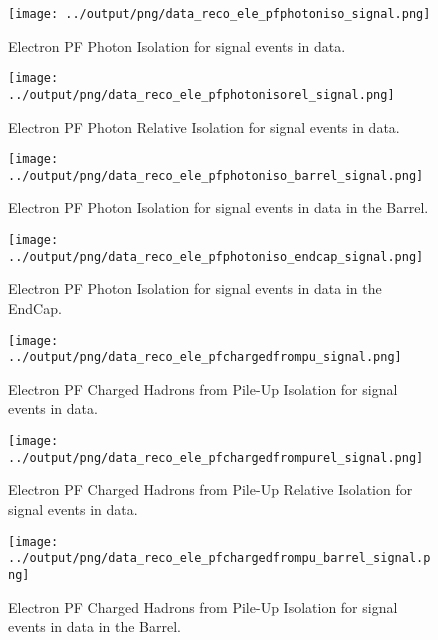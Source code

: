 \documentclass[11pt]{book}
\begin{document}
\begin{figure}[htb]
\centering
\texttt{[image: ../output/png/data\_reco\_ele\_pfphotoniso\_signal.png]}
\caption{Electron PF Photon Isolation for signal events in data.}
\label{fig:data_ele_pfphotoniso_signal}
\end{figure}

\begin{figure}[htb]
\centering
\texttt{[image: ../output/png/data\_reco\_ele\_pfphotonisorel\_signal.png]}
\caption{Electron PF Photon Relative Isolation for signal events in data.}
\label{fig:data_ele_pfphotonisorel_signal}
\end{figure}

\begin{figure}[htb]
\centering
\texttt{[image: ../output/png/data\_reco\_ele\_pfphotoniso\_barrel\_signal.png]}
\caption{Electron PF Photon Isolation for signal events in data in the Barrel.}
\label{fig:data_ele_pfphotoniso_barrel_signal}
\end{figure}

\begin{figure}[htb]
\centering
\texttt{[image: ../output/png/data\_reco\_ele\_pfphotoniso\_endcap\_signal.png]}
\caption{Electron PF Photon Isolation for signal events in data in the EndCap.}
\label{fig:data_ele_pfphotoniso_endcap_signal}
\end{figure}

\begin{figure}[htb]
\centering
\texttt{[image: ../output/png/data\_reco\_ele\_pfchargedfrompu\_signal.png]}
\caption{Electron PF Charged Hadrons from Pile-Up Isolation for signal events in data.}
\label{fig:data_ele_pfchargedfrompu_signal}
\end{figure}

\begin{figure}[htb]
\centering
\texttt{[image: ../output/png/data\_reco\_ele\_pfchargedfrompurel\_signal.png]}
\caption{Electron PF Charged Hadrons from Pile-Up Relative Isolation for signal events in data.}
\label{fig:data_ele_pfchargedfrompurel_signal}
\end{figure}

\begin{figure}[htb]
\centering
\texttt{[image: ../output/png/data\_reco\_ele\_pfchargedfrompu\_barrel\_signal.png]}
\caption{Electron PF Charged Hadrons from Pile-Up Isolation for signal events in data in the Barrel.}
\label{fig:data_ele_pfchargedfrompu_barrel_signal}
\end{figure}
\end{document}
